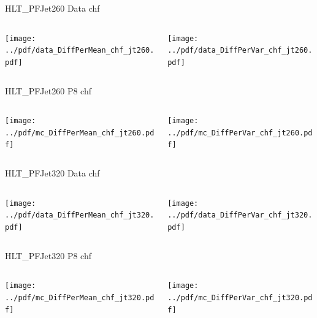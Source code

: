 \documentclass[9pt]{beamer}
\begin{document}
\begin{frame}[t]{HLT\_PFJet260 Data chf}
\begin{columns}[T]
  \begin{column}{.5\textwidth}
  \texttt{[image: ../pdf/data\_DiffPerMean\_chf\_jt260.pdf]}
  \end{column}
  \begin{column}{.5\textwidth}
  \texttt{[image: ../pdf/data\_DiffPerVar\_chf\_jt260.pdf]}
  \end{column}
\end{columns}
\end{frame}

\begin{frame}[t]{HLT\_PFJet260 P8 chf}
\begin{columns}[T]
  \begin{column}{.5\textwidth}
  \texttt{[image: ../pdf/mc\_DiffPerMean\_chf\_jt260.pdf]}
  \end{column}
  \begin{column}{.5\textwidth}
  \texttt{[image: ../pdf/mc\_DiffPerVar\_chf\_jt260.pdf]}
  \end{column}
\end{columns}
\end{frame}

\begin{frame}[t]{HLT\_PFJet320 Data chf}
\begin{columns}[T]
  \begin{column}{.5\textwidth}
  \texttt{[image: ../pdf/data\_DiffPerMean\_chf\_jt320.pdf]}
  \end{column}
  \begin{column}{.5\textwidth}
  \texttt{[image: ../pdf/data\_DiffPerVar\_chf\_jt320.pdf]}
  \end{column}
\end{columns}
\end{frame}

\begin{frame}[t]{HLT\_PFJet320 P8 chf}
\begin{columns}[T]
  \begin{column}{.5\textwidth}
  \texttt{[image: ../pdf/mc\_DiffPerMean\_chf\_jt320.pdf]}
  \end{column}
  \begin{column}{.5\textwidth}
  \texttt{[image: ../pdf/mc\_DiffPerVar\_chf\_jt320.pdf]}
  \end{column}
\end{columns}
\end{frame}
\end{document}
